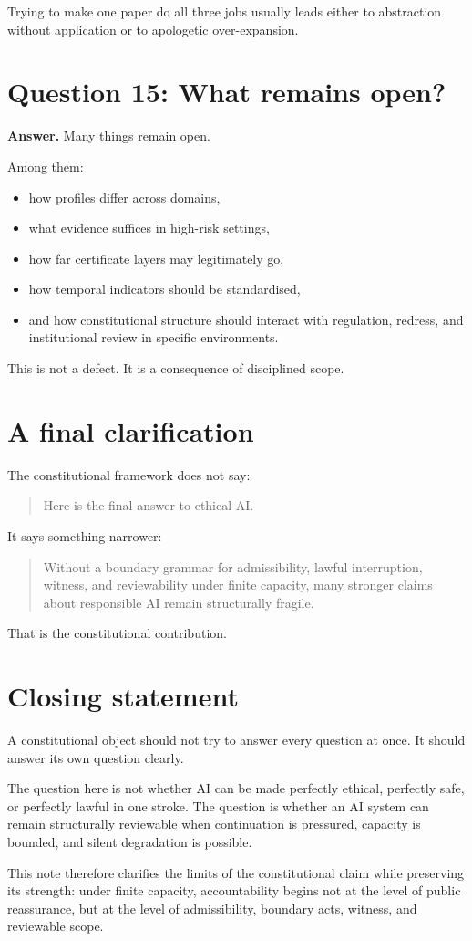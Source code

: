 \documentclass[11pt]{article}
\begin{document}
Trying to make one paper do all three jobs usually leads either to abstraction without application or to apologetic over-expansion.

\section{Question 15: What remains open?}

\textbf{Answer.} Many things remain open.

Among them:
\begin{itemize}[leftmargin=2em]
    \item how profiles differ across domains,
    \item what evidence suffices in high-risk settings,
    \item how far certificate layers may legitimately go,
    \item how temporal indicators should be standardised,
    \item and how constitutional structure should interact with regulation, redress, and institutional review in specific environments.
\end{itemize}

This is not a defect. It is a consequence of disciplined scope.

\section{A final clarification}

The constitutional framework does not say:
\begin{quote}
Here is the final answer to ethical AI.
\end{quote}

It says something narrower:
\begin{quote}
Without a boundary grammar for admissibility, lawful interruption, witness, and reviewability under finite capacity, many stronger claims about responsible AI remain structurally fragile.
\end{quote}

That is the constitutional contribution.

\section*{Closing statement}

A constitutional object should not try to answer every question at once.  
It should answer its own question clearly.  

The question here is not whether AI can be made perfectly ethical, perfectly safe, or perfectly lawful in one stroke. The question is whether an AI system can remain structurally reviewable when continuation is pressured, capacity is bounded, and silent degradation is possible.

This note therefore clarifies the limits of the constitutional claim while preserving its strength: under finite capacity, accountability begins not at the level of public reassurance, but at the level of admissibility, boundary acts, witness, and reviewable scope.
\end{document}
